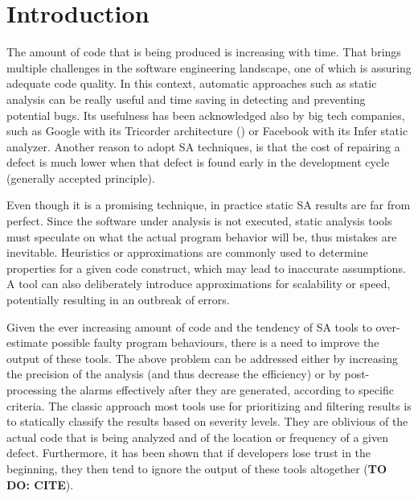 
\section{Introduction}\label{sec:introduction}


The amount of code that is being produced is increasing with time. That brings multiple challenges in the software engineering landscape, one of which is assuring adequate code quality. In this context, automatic approaches such as static analysis can be really useful and time saving in detecting and preventing potential bugs. Its usefulness has been acknowledged also by big tech companies, such as Google with its Tricorder architecture (\cite{sa_google}) or Facebook with its Infer static analyzer.
Another reason to adopt SA techniques, is that the cost of repairing a defect is much lower when that defect is found early in the development cycle (generally accepted principle).

Even though it is a promising technique, in practice static SA results are far from perfect. Since the software under analysis is not executed, static analysis tools must speculate on what the actual program behavior will be, thus mistakes are inevitable. Heuristics or approximations are commonly used to determine properties for a given code construct, which may lead to inaccurate assumptions. A tool can also deliberately introduce approximations for scalability or speed, potentially resulting in an outbreak of errors.

Given the ever increasing amount of code and the tendency of SA tools to over-estimate possible faulty program behaviours, there is a need to improve the output of these tools. The above problem can be addressed either by increasing the precision of the analysis (and thus decrease the efficiency) or by post-processing the alarms effectively after they are generated, according to specific criteria.
The classic approach most tools use for prioritizing and filtering results is to statically classify the results based on severity levels. They are oblivious of the actual code that is being analyzed and of the location or frequency of a given defect. Furthermore, it has been shown that if developers lose trust in the beginning, they then tend to ignore the output of these tools altogether (\textbf{TO DO: CITE}).

